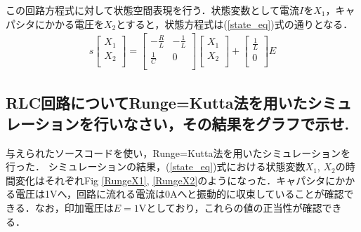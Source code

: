 \documentclass[a4paper,10pt,twocolumn,fleqn]{jarticle}
\begin{document}
    この回路方程式に対して状態空間表現を行う．状態変数として電流$I$を$X_1$，キャパシタにかかる電圧を$X_2$とすると，状態方程式は(\ref{state_eq})式の通りとなる．
    \begin{eqnarray}
      \label{state_eq}
        s
        \left[
          \begin{array}{c}
            X_1 \\
            X_2 \\
          \end{array}
        \right]
        =
        \left[
          \begin{array}{cc}
            -\frac{R}{L} & -\frac{1}{L} \\
            \frac{1}{C} & 0 \\
          \end{array}
        \right]
        \left[
          \begin{array}{c}
            X_1 \\
            X_2 \\
          \end{array}
        \right]
        +
        \left[
          \begin{array}{c}
            \frac{1}{L} \\
            0 \\
          \end{array}
        \right]
        E
    \end{eqnarray}

  \subsection{RLC回路についてRunge=Kutta法を用いたシミュレーションを行いなさい，その結果をグラフで示せ.}

    与えられたソースコードを使い，Runge=Kutta法を用いたシミュレーションを行った．%
    シミュレーションの結果，(\ref{state_eq})式における状態変数$X_1$, $X_2$の時間変化はそれぞれFig \ref{RungeX1}, \ref{RungeX2}のようになった．キャパシタにかかる電圧は1Vへ，回路に流れる電流は0Aへと振動的に収束していることが確認できる．なお，印加電圧は$E = 1$Vとしており，これらの値の正当性が確認できる．

\begin{comment}
  \begin{table}[htp]
    \centering
    \caption{The constant values of the circuit}
    \begin{tabular}{|l|l|}
      \hline
      $E$ & 1.0[V] (t $>$ 0)\\ \hline
      $R$ & 1.0[$\Omega$]  \\ \hline
      $L$ & 3.0[mH] \\ \hline
      $C$ & 4.7[$\mu$ F]  \\ \hline
    \end{tabular}
  \end{table}
\end{comment}
\end{document}
